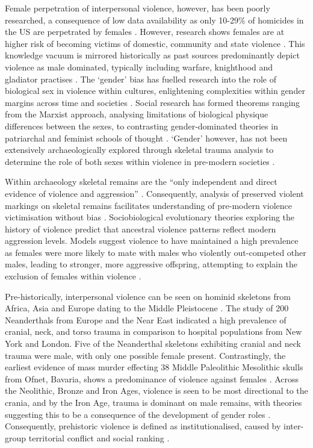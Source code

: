 Female perpetration of interpersonal violence, however, has been poorly researched, a consequence of low data availability as only 10-29\% of homicides in the US are perpetrated by females \parencite{dewees2003}. 
However, research shows females are at higher risk of becoming victims of domestic, community and state violence \parencite{worldhealthorganization2002}. 
This knowledge vacuum is mirrored historically as past sources predominantly depict violence as male dominated, typically including warfare, knighthood and gladiator practises \parencites{pohl1998}{mccullough2008}. 
The ‘gender’ bias has fuelled research into the role of biological sex in violence within cultures, enlightening complexities within gender margins across time and societies \parencite{moore1997}. 
Social research has formed theorems ranging from the Marxist approach, analysing limitations of biological physique differences between the sexes, to contrasting gender-dominated theories in patriarchal and feminist schools of thought \parencites{mackinnon1982}{lorber1994}{udry1994}{burda2007}. 
‘Gender’ however, has not been extensively archaeologically explored through skeletal trauma analysis to determine the role of both sexes within violence in pre-modern societies \parencites{krahn1986}{martin1998}{belknap2001}.

Within archaeology skeletal remains are the “only independent and direct evidence of violence and aggression” \parencite[1]{redfern2013}.  
Consequently, analysis of preserved violent markings on skeletal remains facilitates understanding of pre-modern violence victimisation without bias \parencite{robb1997}. 
Sociobiological evolutionary theories exploring the history of violence predict that ancestral violence patterns reflect modern aggression levels.  Models suggest violence to have maintained a high prevalence as females were more likely to mate with males who violently out-competed other males, leading to stronger, more aggressive offspring, attempting to explain the exclusion of females within violence \parencites{wrangham1996}{mccall2008}. 

Pre-historically, interpersonal violence can be seen on hominid skeletons from Africa, Asia and Europe dating to the Middle Pleistocene \parencite{klein1999}. 
The \textcite{berger1995} study of 200 Neanderthals from Europe and the Near East indicated a high prevalence of cranial, neck, and torso trauma in comparison to hospital populations from New York and London. Five of the Neanderthal skeletons exhibiting cranial and neck trauma were male, with only one possible female present. 
Contrastingly, the earliest evidence of mass murder effecting 38 Middle Paleolithic Mesolithic skulls from Ofnet, Bavaria, shows a predominance of violence against females \parencites{frayer1997}{richards2000}{gardiner1999}{walker2001}. 
Across the Neolithic, Bronze and Iron Ages, violence is seen to be most directional to the crania, and by the Iron Age, trauma is dominant on male remains, with theories suggesting this to be a consequence of the development of gender roles \parencite{robb1997}. 
Consequently, prehistoric violence is defined as institutionalised, caused by inter-group territorial conflict and social ranking \parencite{mccall2008}. 

